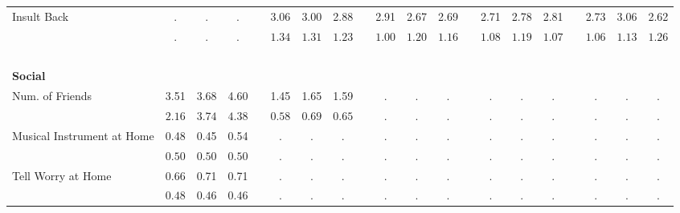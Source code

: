 \begin{center}
{\begin{longtable}{L{5cm} c c c p{.5cm} c c c p{.5cm} c c c p{.5cm} c c c p{.5cm} c c c}
 \quad Insult Back & . &         . &         . & &      3.06 &      3.00 &      2.88 & &      2.91 &      2.67 &      2.69 & &      2.71 &      2.78 &      2.81 & &      2.73 &      3.06 &      2.62 \\*
 \quad & $\mathit{        .}$ & $\mathit{        .}$ & $\mathit{        .}$ & & $\mathit{     1.34}$ & $\mathit{     1.31}$ & $\mathit{     1.23}$ & & $\mathit{     1.00}$ & $\mathit{     1.20}$ & $\mathit{     1.16}$ & & $\mathit{     1.08}$ & $\mathit{     1.19}$ & $\mathit{     1.07}$ & & $\mathit{     1.06}$ & $\mathit{     1.13}$ & $\mathit{     1.26}$ \\[.2em]
 ~\\[-.5em]
\textbf{Social} \\[.6em]
 \quad Num. of Friends & 3.51 &      3.68 &      4.60 & &      1.45 &      1.65 &      1.59 & &         . &         . &         . & &         . &         . &         . & &         . &         . &         . \\*
 \quad & $\mathit{     2.16}$ & $\mathit{     3.74}$ & $\mathit{     4.38}$ & & $\mathit{     0.58}$ & $\mathit{     0.69}$ & $\mathit{     0.65}$ & & $\mathit{        .}$ & $\mathit{        .}$ & $\mathit{        .}$ & & $\mathit{        .}$ & $\mathit{        .}$ & $\mathit{        .}$ & & $\mathit{        .}$ & $\mathit{        .}$ & $\mathit{        .}$ \\[.2em]
 \quad Musical Instrument at Home & 0.48 &      0.45 &      0.54 & &         . &         . &         . & &         . &         . &         . & &         . &         . &         . & &         . &         . &         . \\*
 \quad & $\mathit{     0.50}$ & $\mathit{     0.50}$ & $\mathit{     0.50}$ & & $\mathit{        .}$ & $\mathit{        .}$ & $\mathit{        .}$ & & $\mathit{        .}$ & $\mathit{        .}$ & $\mathit{        .}$ & & $\mathit{        .}$ & $\mathit{        .}$ & $\mathit{        .}$ & & $\mathit{        .}$ & $\mathit{        .}$ & $\mathit{        .}$ \\[.2em]
 \quad Tell Worry at Home & 0.66 &      0.71 &      0.71 & &         . &         . &         . & &         . &         . &         . & &         . &         . &         . & &         . &         . &         . \\*
 \quad & $\mathit{     0.48}$ & $\mathit{     0.46}$ & $\mathit{     0.46}$ & & $\mathit{        .}$ & $\mathit{        .}$ & $\mathit{        .}$ & & $\mathit{        .}$ & $\mathit{        .}$ & $\mathit{        .}$ & & $\mathit{        .}$ & $\mathit{        .}$ & $\mathit{        .}$ & & $\mathit{        .}$ & $\mathit{        .}$ & $\mathit{        .}$ \\[.2em]

\end{longtable}}
\end{center}

